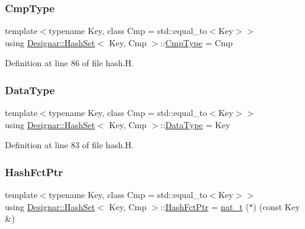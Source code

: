\subsubsection{\texorpdfstring{Cmp\+Type}{CmpType}}
{\footnotesize\ttfamily template$<$typename Key, class Cmp = std\+::equal\+\_\+to$<$\+Key$>$$>$ \\
using \hyperlink{class_designar_1_1_hash_set}{Designar\+::\+Hash\+Set}$<$ Key, Cmp $>$\+::\hyperlink{class_designar_1_1_hash_set_ad0ab040392888a3320d2d72d1ead9968}{Cmp\+Type} =  Cmp}



Definition at line 86 of file hash.\+H.

\mbox{\label{class_designar_1_1_hash_set_af75f5917c5f53891a4129bd77d5d2906}} 
\subsubsection{\texorpdfstring{Data\+Type}{DataType}}
{\footnotesize\ttfamily template$<$typename Key, class Cmp = std\+::equal\+\_\+to$<$\+Key$>$$>$ \\
using \hyperlink{class_designar_1_1_hash_set}{Designar\+::\+Hash\+Set}$<$ Key, Cmp $>$\+::\hyperlink{class_designar_1_1_hash_set_af75f5917c5f53891a4129bd77d5d2906}{Data\+Type} =  Key}



Definition at line 83 of file hash.\+H.

\mbox{\label{class_designar_1_1_hash_set_a7a8b0a4970519ebc9ccc1ad247d0639f}} 
\subsubsection{\texorpdfstring{Hash\+Fct\+Ptr}{HashFctPtr}}
{\footnotesize\ttfamily template$<$typename Key, class Cmp = std\+::equal\+\_\+to$<$\+Key$>$$>$ \\
using \hyperlink{class_designar_1_1_hash_set}{Designar\+::\+Hash\+Set}$<$ Key, Cmp $>$\+::\hyperlink{class_designar_1_1_hash_set_a7a8b0a4970519ebc9ccc1ad247d0639f}{Hash\+Fct\+Ptr} =  \hyperlink{namespace_designar_aa72662848b9f4815e7bf31a7cf3e33d1}{nat\+\_\+t} ($\ast$) (const Key \&)}



